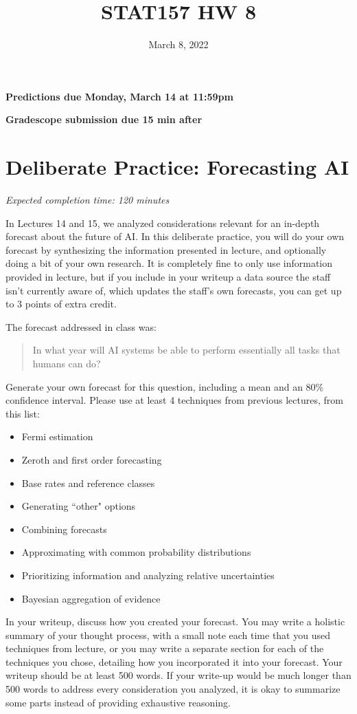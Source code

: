 \documentclass[11pt]{article}
\title{STAT157 HW 8}
\date{March 8, 2022}
\begin{document}
\maketitle

\hfill \textbf{Predictions due Monday, March 14 at 11:59pm}

\hfill \textbf{Gradescope submission due 15 min after}


\section*{Deliberate Practice: Forecasting AI}

\emph{Expected completion time: 120 minutes}

In Lectures 14 and 15, we analyzed considerations relevant for an in-depth forecast about the future of AI. In this deliberate practice, you will do your own forecast by synthesizing the information presented in lecture, and optionally doing a bit of your own research. It is completely fine to only use information provided in lecture, but if you include in your writeup a data source the staff isn't currently aware of, which updates the staff's own forecasts, you can get up to 3 points of extra credit.

The forecast addressed in class was:
\begin{quote}
	In what year will AI systems be able to perform essentially all tasks that humans can do?
\end{quote}
Generate your own forecast for this question, including a mean and an 80\% confidence interval. Please use at least 4 techniques from previous lectures, from this list:
\begin{itemize}
	\item Fermi estimation
	\item Zeroth and first order forecasting
	\item Base rates and reference classes
	\item Generating ``other" options
	\item Combining forecasts
	\item Approximating with common probability distributions
	\item Prioritizing information and analyzing relative uncertainties
	\item Bayesian aggregation of evidence
\end{itemize}

In your writeup, discuss how you created your forecast. You may write a holistic summary of your thought process, with a small note each time that you used techniques from lecture, or you may write a separate section for each of the techniques you chose, detailing how you incorporated it into your forecast. Your writeup should be at least 500 words. If your write-up would be much longer than 500 words to address every consideration you analyzed, it is okay to summarize some parts instead of providing exhaustive reasoning.
\end{document}
